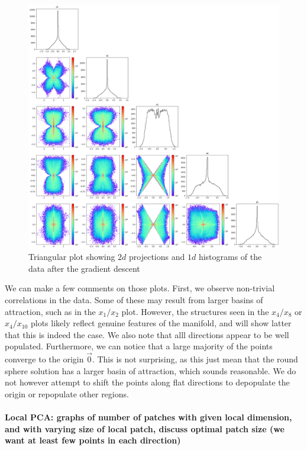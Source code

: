 \documentclass[11pt]{article}
\begin{document}
		\begin{figure}[t]
			\centering
			\includegraphics[scale = 0.25]{Figures/triangular_plot_1_2_4_8_10.png} %
			\caption{Triangular plot showing $2d$ projections and $1d$ histograms of the data after the gradient descent}
			\label{triangular_plot_1_2_4_8_10}
		\end{figure}
		
		We can make a few comments on those plots. First, we observe non-trivial correlations in the data. Some of these may result from larger basins of attraction, such as in the $x_1/x_2$ plot. However, the structures seen in the $x_4/x_8$ or $x_4/x_{10}$ plots likely reflect genuine features of the manifold, and will show latter that this is indeed the case. We also note that alll directions appear to be well populated. Furthermore, we can notice that a large majority of the points converge to the origin $\vec{0}$. This is not surprising, as this just mean that the round sphere solution has a larger basin of attraction, which sounds reasonable. We do not however attempt to shift the points along flat directions to depopulate the origin or repopulate other regions.

		\paragraph{Local PCA: graphs of number of patches with given local dimension, and with varying size of local patch, discuss optimal patch size (we want at least few points in each direction)}
\end{document}
